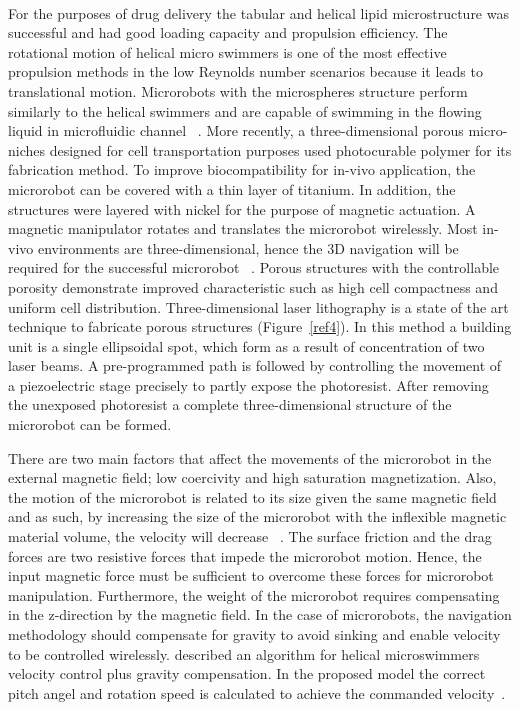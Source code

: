 \documentclass[a4paper,11pt]{article}
\begin{document}
\begin{sloppypar}
\paragraph{}
 For the purposes of drug delivery the tabular and helical lipid microstructure was successful
 and had good loading capacity and propulsion efficiency. The rotational motion of helical micro
 swimmers is one of the most effective propulsion methods in the low Reynolds number scenarios 
because it leads to translational motion. Microrobots with the microspheres structure perform similarly 
to the helical swimmers and are capable of swimming in the flowing liquid in microfluidic channel ~\citep{kim2013fabrication}. 
More recently, a three-dimensional porous micro-niches designed for cell transportation purposes used
 photocurable polymer for its fabrication method. To improve biocompatibility for in-vivo application, the 
microrobot can be covered with a thin layer of titanium. In addition, the structures were layered with 
nickel for the purpose of magnetic actuation. A magnetic manipulator rotates and translates the 
microrobot wirelessly. Most in-vivo environments are three-dimensional, hence the 3D navigation will be 
required for the successful microrobot ~\citep{kim2013fabrication}.
Porous structures with the controllable porosity demonstrate improved characteristic such as high cell 
compactness and uniform cell distribution. Three-dimensional 
laser lithography is a state of the art technique to fabricate porous structures (Figure~\ref{ref4}). In this method a building unit is a 
single ellipsoidal spot, which form as a result of concentration of two laser beams. A pre-programmed path 
is followed by controlling the movement of a piezoelectric stage precisely to partly expose the photoresist.
 After removing the unexposed photoresist a complete three-dimensional structure of the microrobot can 
be formed.   

There are two main factors that affect the movements of the microrobot in the external magnetic
 field; low coercivity and high saturation magnetization. Also, the motion of the microrobot is related to 
its size given the same magnetic field and as such, by increasing the size of the microrobot with the inflexible magnetic material
 volume, the velocity will decrease ~\citep{kim2013fabrication}. 
The surface friction and the drag forces are two resistive forces that impede the microrobot 
motion. Hence, the input magnetic force must be sufficient to overcome these forces for microrobot 
manipulation. Furthermore, the weight of the microrobot requires compensating in the z-direction by 
the magnetic field. In the case of microrobots, the navigation methodology should compensate for gravity to avoid sinking and enable velocity to be 
controlled wirelessly. \citeauthor{mahoney2011velocity} described an algorithm for helical microswimmers velocity 
control plus gravity compensation. In the proposed model the correct pitch angel and 
rotation speed is calculated to achieve the commanded velocity~\citep{mahoney2011velocity}.




\end{sloppypar}
\end{document}
